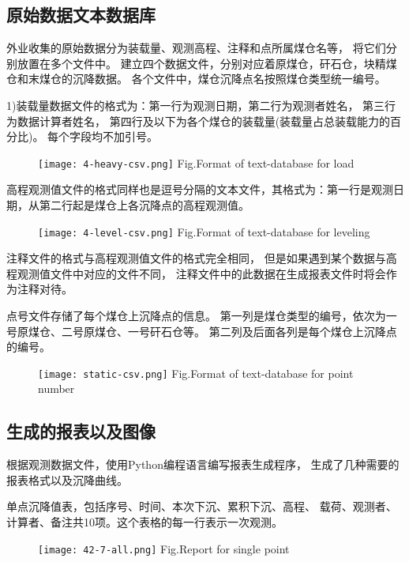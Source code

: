 \subsection{原始数据文本数据库}
外业收集的原始数据分为装载量、观测高程、注释和点所属煤仓名等，
将它们分别放置在多个文件中。
建立四个数据文件，分别对应着原煤仓，矸石仓，块精煤仓和末煤仓的沉降数据。
各个文件中，煤仓沉降点名按照煤仓类型统一编号。

1)装载量数据文件的格式为：第一行为观测日期，第二行为观测者姓名，
第三行为数据计算者姓名，
第四行及以下为各个煤仓的装载量(装载量占总装载能力的百分比)。
每个字段均不加引号。
\begin{figure}[!htbp]
   \centering
   \texttt{[image: 4-heavy-csv.png]}
			{Fig.}{Format of text-database for load}
\end{figure}

高程观测值文件的格式同样也是逗号分隔的文本文件，其格式为：第一行是观测日期，从第二行起是煤仓上各沉降点的高程观测值。
\begin{figure}[!htbp]
   \centering
   \texttt{[image: 4-level-csv.png]}
			{Fig.}{Format of text-database for leveling}
\end{figure}

注释文件的格式与高程观测值文件的格式完全相同，
但是如果遇到某个数据与高程观测值文件中对应的文件不同，
注释文件中的此数据在生成报表文件时将会作为注释对待。

\newpage
点号文件存储了每个煤仓上沉降点的信息。
第一列是煤仓类型的编号，依次为一号原煤仓、二号原煤仓、一号矸石仓等。
第二列及后面各列是每个煤仓上沉降点的编号。
\begin{figure}[!htbp]
   \centering
   \texttt{[image: static-csv.png]}
			{Fig.}{Format of text-database for point number}
\end{figure}

\subsection{生成的报表以及图像}
根据观测数据文件，使用Python编程语言编写报表生成程序，
生成了几种需要的报表格式以及沉降曲线。

单点沉降值表，包括序号、时间、本次下沉、累积下沉、高程、
载荷、观测者、计算者、备注共10项。这个表格的每一行表示一次观测。
\begin{figure}[!htbp]
   \centering
   \texttt{[image: 42-7-all.png]}
			{Fig.}{Report for single point}
\end{figure}

